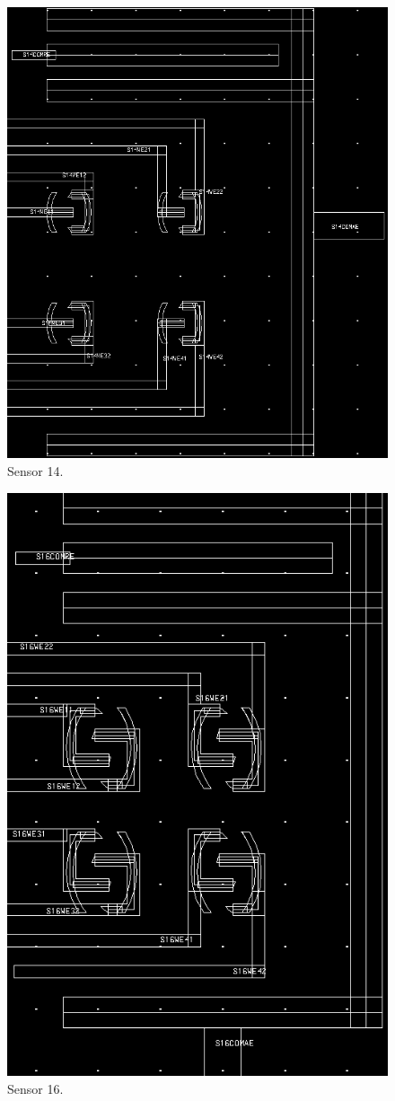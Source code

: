 \begin{figure}
	\centering
	\includegraphics[width=0.7\linewidth]{figures/s14.png}
	\caption{Sensor 14.}
	\label{s14}
\end{figure}

\begin{figure}
	\centering
	\includegraphics[width=0.7\linewidth]{figures/s16.png}
	\caption{Sensor 16.}
	\label{s16}
\end{figure}

